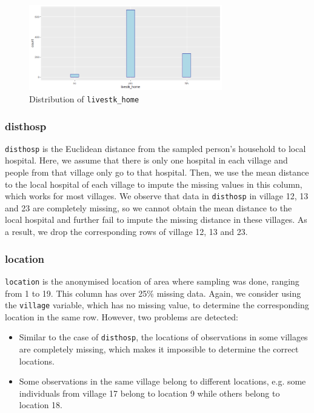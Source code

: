 \documentclass[11pt,twoside]{article}
\numberwithin{Theorem}{section}
\numberwithin{Definition}{section}
\numberwithin{Lemma}{section}
\numberwithin{Algorithm}{section}
\numberwithin{equation}{section}
\begin{document}
\begin{figure}[!h]
	\centering
	\includegraphics[width = 0.75\textwidth]{Images/livestk.png}
	\caption{Distribution of \texttt{livestk\_home}}
	\label{fig:livestk}
\end{figure}

\subsubsection{disthosp}

\texttt{disthosp} is the Euclidean distance from the sampled person's household to local hospital. Here, we assume that there is only one hospital in each village and people from that village only go to that hospital. Then, we use the mean distance to the local hospital of each village to impute the missing values in this column, which works for most villages. We observe that data in \texttt{disthosp} in village 12, 13 and 23 are completely missing, so we cannot obtain the mean distance to the local hospital and further fail to impute the missing distance in these villages. As a result, we drop the corresponding rows of village 12, 13 and 23.

\subsubsection{location}

\texttt{location} is the anonymised location of area where sampling was done, ranging from 1 to 19. This column has over 25\% missing data. Again, we consider using the \texttt{village} variable, which has no missing value, to determine the corresponding location in the same row. However, two problems are detected:

\begin{itemize}
	\item Similar to the case of \texttt{disthosp}, the locations of observations in some villages are completely missing, which makes it impossible to determine the correct locations.
	\item Some observations in the same village belong to different locations, e.g. some individuals from village 17 belong to location 9 while others belong to location 18.
\end{itemize}
\end{document}
